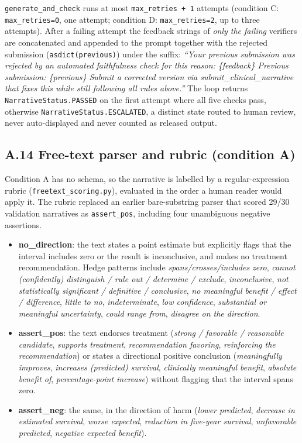 \texttt{generate\_and\_check} runs at most \texttt{max\_retries + 1} attempts
(condition C: \texttt{max\_retries=0}, one attempt; condition D:
\texttt{max\_retries=2}, up to three attempts). After a failing attempt the
feedback strings of \emph{only the failing} verifiers are concatenated and
appended to the prompt together with the rejected submission
(\texttt{asdict(previous)}) under the suffix: \emph{``Your previous submission
was rejected by an automated faithfulness check for this reason: \{feedback\}
Previous submission: \{previous\} Submit a corrected version via
submit\_clinical\_narrative that fixes this while still following all rules
above.''} The loop returns \texttt{NarrativeStatus.PASSED} on the first attempt
where all five checks pass, otherwise
\texttt{NarrativeStatus.ESCALATED}, a distinct state routed to human review,
never auto-displayed and never counted as released output.

\subsection*{A.14 Free-text parser and rubric (condition A)}

Condition A has no schema, so the narrative is labelled by a regular-expression
rubric (\texttt{freetext\_scoring.py}), evaluated in the order a human reader
would apply it. The rubric replaced an earlier bare-substring parser that
scored 29/30 validation narratives as \texttt{assert\_pos}, including four
unambiguous negative assertions.

\begin{itemize}\tightlist
\item \textbf{no\_direction}: the text states a point estimate but explicitly
flags that the interval includes zero or the result is inconclusive, and makes
no treatment recommendation. Hedge patterns include \emph{spans/crosses/includes
zero}, \emph{cannot (confidently) distinguish / rule out / determine / exclude},
\emph{inconclusive}, \emph{not statistically significant / definitive /
conclusive}, \emph{no meaningful benefit / effect / difference}, \emph{little to
no}, \emph{indeterminate}, \emph{low confidence}, \emph{substantial or
meaningful uncertainty}, \emph{could range from}, \emph{disagree on the
direction}.
\item \textbf{assert\_pos}: the text endorses treatment (\emph{strong /
favorable / reasonable candidate}, \emph{supports treatment},
\emph{recommendation favoring}, \emph{reinforcing the recommendation}) or states
a directional positive conclusion (\emph{meaningfully improves}, \emph{increases
(predicted) survival}, \emph{clinically meaningful benefit}, \emph{absolute
benefit of}, \emph{percentage-point increase}) without flagging that the
interval spans zero.
\item \textbf{assert\_neg}: the same, in the direction of harm (\emph{lower
predicted}, \emph{decrease in estimated survival}, \emph{worse expected},
\emph{reduction in five-year survival}, \emph{unfavorable predicted},
\emph{negative expected benefit}).
\end{itemize}

